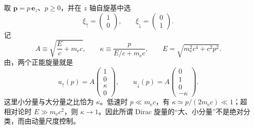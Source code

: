 \begin{exbox}[沿 $z$ 方向运动的电子]
取 $\mathbf p=p\,\mathbf e_z$、$p\ge0$，并在 $z$ 轴自旋基中选
\begin{equation*}
 \xi_\uparrow=\begin{pmatrix}1\\0\end{pmatrix},
 \qquad
 \xi_\downarrow=\begin{pmatrix}0\\1\end{pmatrix}.
\end{equation*}
记
\begin{equation*}
 A\equiv\sqrt{\frac{E}{c}+m_{\mathrm e} c},
 \qquad
 \kappa\equiv\frac{p}{E/c+m_{\mathrm e} c},
 \qquad
 E=\sqrt{m_{\mathrm e}^2c^4+c^2p^2}.
\end{equation*}
由，两个正能旋量就是
\begin{equation}
 u_\uparrow(p)=A
 \begin{pmatrix}1\\0\\\kappa\\0\end{pmatrix},
 \qquad
 u_\downarrow(p)=A
 \begin{pmatrix}0\\1\\0\\-\kappa\end{pmatrix}.
 \label{eq:explicit-z-spinors-dp62}
\end{equation}
这里小分量与大分量之比恰为 $\kappa$。低速时 $p\ll m_{\mathrm e} c$，有 $\kappa\simeq p/(2m_{\mathrm e} c)\ll1$；超相对论时 $E\gg m_{\mathrm e} c^2$，则 $\kappa\to1$。因此所谓 Dirac 旋量的“大、小分量”不是绝对分类，而由动量尺度控制。


\end{exbox}
